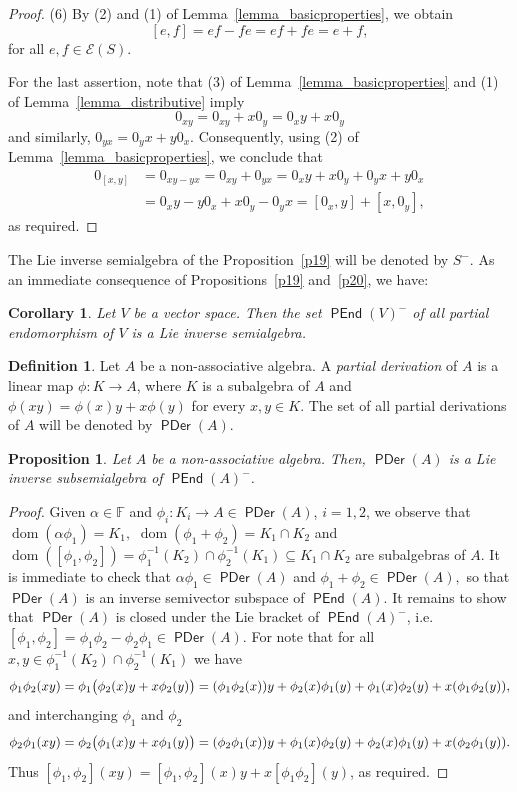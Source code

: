 \documentclass{amsart}
\newcommand{\E}{\mathcal{E}}
\newcommand{\F}{\mathbb{F}}
\newcommand{\0}{{\vartheta}}
\newtheorem{cor}[thm]{Corollary}
\newtheorem{prop}[thm]{Proposition}
\theoremstyle{definition}
\newtheorem{defn}[thm]{Definition}
\theoremstyle{remark}
\numberwithin{equation}{section}
\newtheorem*{Theorem A}{\textbf{Theorem A}}
\newtheorem*{Corollary E}{\textbf{Corollary E}}
\newtheorem*{Corollary F}{\textbf{Corollary F}}
\newtheorem*{Theorem B}{\textbf{Theorem B}}
\newtheorem*{Theorem C}{\textbf{Theorem C}}
\newtheorem*{Theorem D}{\textbf{Theorem B}}
\newtheorem*{p a}{\textbf{Proof of  Theorem A}}
\newtheorem*{p b}{\textbf{Proof of Theorem B}}
\newtheorem*{p c}{\textbf{Proof of  Theorem C}}
\newtheorem*{p d}{\textbf{Proof of  Theorem D}}
\DeclareMathOperator{\dom}{dom}
\DeclareMathOperator{\pen}{\textsf{PEnd}}
\DeclareMathOperator{\pde}{\textsf{PDer}}
\begin{document}
\begin{proof}
(6)  By (2) and (1)  of Lemma~\ref{lemma_basicproperties}, we obtain
$$[e,f] = ef-fe = ef+fe = e+f, $$
for all $e,f \in \E(S).$

For the last assertion, note that    (3) of  Lemma~\ref{lemma_basicproperties} and (1) of  Lemma~\ref{lemma_distributive}   imply 
$$0_{xy} = 0_{xy} + x 0_y =  0_{x}y + x 0_y $$ and similarly,  $0_{yx} = 0_y x + y 0_x.$ Consequently, using  (2) of  Lemma~\ref{lemma_basicproperties}, we conclude that
\begin{align*} 
0_{[x,y]}&=0_{xy - yx}=   0_{xy}+0_{yx}=  0_{x}y + x 0_y +  0_y x + y 0_x\\
& = 0_{x}y - y 0_x + x 0_y -  0_y x  =
[0_x,y]+[x,0_y],
\end{align*} 
as required.
\end{proof}

The Lie inverse semialgebra of the Proposition~\ref{p19} will be denoted by $S^-$. As an immediate consequence of Propositions~\ref{p19} and~\ref{p20}, we have: 


\begin{cor}
Let $V$ be a vector space. Then the set $\pen(V)^-$ of all partial endomorphism of $V$ is a Lie inverse semialgebra.
\end{cor}


\begin{defn}
Let $A$ be a non-associative algebra. A {\em partial derivation } of $A$ is a linear map $\phi : K \rightarrow A$, where $K$ is a subalgebra of $A$ and 
$\phi (x y)=\phi(x)y+x\phi(y)$
 for every $x, y \in K$. The set of all partial derivations of $A$ will be denoted by $\pde(A)$.
\end{defn}
\begin{prop}
Let $A$ be a non-associative algebra. Then, $\pde(A)$ is a  Lie inverse subsemialgebra of $\pen(A)^-$.
\end{prop}
\begin{proof}
Given $\alpha \in \F$ and $\phi_i: K_i\to A\in \pde(A)$, $i=1,2$, we observe that
$\dom(\alpha \phi_1) = K_1,$  $\dom(\phi_1+\phi_2)=K_1\cap K_2$ and $\dom([\phi_1,\phi_2])=\phi_1^{-1}(K_2)\cap \phi_2^{-1}(K_1) \subseteq K_1 \cap K_2$ are subalgebras of $A$.
It is immediate to check that  $\alpha \phi_1 \in \pde(A)$ and $ \phi_1+\phi_2\in \pde(A),$ so that 
$\pde(A)$ is an inverse semivector subspace of $\pen(A).$ It remains  to show that $\pde(A)$ is closed under  the Lie bracket of $\pen(A)^-$, i.e. 
 $[\phi_1,\phi_2]=\phi_1\phi_2-\phi_2\phi_1\in \pde(A).$  For note that for all $x,y\in \phi_1^{-1}(K_2)\cap \phi_2^{-1}(K_1)$ we have 
$$\phi_1\phi_2(xy)=\phi_1 \big{(} \phi_2(x) y+ x\phi_2(y)\big{)}= (\phi_1\phi_2(x))y+\phi_2(x)\phi_1(y)+\phi_1(x)\phi_2(y)+x(\phi_1\phi_2(y)),$$
and interchanging $\phi_1$ and  $\phi_2$
$$\phi_2\phi_1(xy)=\phi_2 \big{(} \phi_1(x) y+ x\phi_1(y)\big{)}= (\phi_2\phi_1(x))y+\phi_1(x)\phi_2(y)+\phi_2(x)\phi_1(y)+x(\phi_2\phi_1(y)).$$
Thus $[\phi_1,\phi_2](xy)=[\phi_1,\phi_2](x)y+x[\phi_1\phi_2](y)$, as required.
\end{proof}
\end{document}
